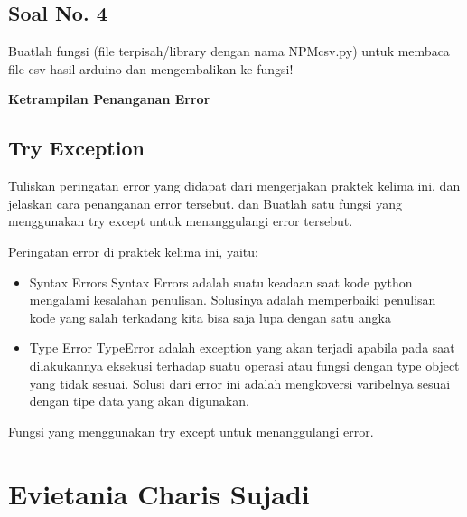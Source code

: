 \subsection{Soal No. 4}
Buatlah fungsi (file terpisah/library dengan nama NPMcsv.py) untuk membaca file csv hasil arduino dan mengembalikan ke fungsi!


\hfill \break
{\Large \textbf{Ketrampilan Penanganan Error}}

\subsection{Try Exception}
Tuliskan  peringatan  error  yang  didapat  dari  mengerjakan  praktek  kelima  ini, dan  jelaskan  cara  penanganan  error  tersebut.   dan  Buatlah  satu  fungsi  yang menggunakan try except untuk menanggulangi error tersebut.

\hfill \break
Peringatan error di praktek kelima ini, yaitu:
\begin{itemize}
	\item Syntax Errors
	Syntax Errors adalah suatu keadaan saat kode python mengalami kesalahan penulisan. Solusinya adalah memperbaiki penulisan kode yang salah terkadang kita bisa saja lupa dengan satu angka
		
	\item Type Error
	TypeError adalah exception yang akan terjadi apabila pada saat dilakukannya eksekusi terhadap suatu operasi atau fungsi dengan type object yang tidak sesuai. Solusi dari error ini adalah mengkoversi varibelnya sesuai dengan tipe data yang akan digunakan.
\end{itemize}

\hfill \break
Fungsi yang menggunakan try except untuk menanggulangi error.




\section{Evietania Charis Sujadi}
